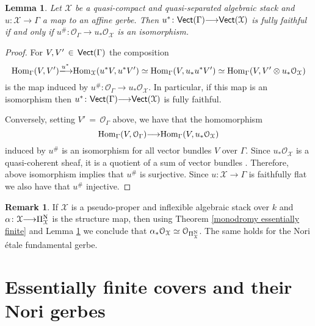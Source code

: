 \documentclass[12pt,reqno]{amsart}
\theoremstyle{plain}
\newtheorem{lem}[thm]{Lemma}
\theoremstyle{definition}
\newtheorem{rmk}[thm]{Remark}
\numberwithin{thm}{section}
\newcounter{x}\setcounter{x}{1}
\theoremstyle{plain}
\begin{document}
\begin{lem}\label{fully faithful on Vect means pushforwars O is O}
 Let ${\mathcal{X}}$ be a quasi-compact and quasi-separated algebraic stack and
$u\colon {\mathcal{X}}{\longrightarrow} \Gamma$ a map to an affine gerbe. Then $u^*\colon {\text{\sf Vect}}(\Gamma) {\longrightarrow} {\text{\sf Vect}}({\mathcal{X}})$ is fully faithful if and only if $u^\#\colon {\mathcal{O}_{\Gamma}}{\longrightarrow} u_*{\mathcal{O}_{\mathcal{X}}}$ is an isomorphism.
\end{lem}

\begin{proof}
For $V,V'\,\in\, {\text{\sf Vect}}(\Gamma)$ the composition 
 \[
 {{\rm Hom}}_\Gamma(V,V'){\xlongrightarrow{{u^*}}} {{\rm Hom}}_{\mathcal{X}}(u^*V,u^*V') \simeq {{\rm Hom}}_\Gamma(V,u_*u^*V') \simeq {{\rm Hom}}_\Gamma(V,V'\otimes u_*{\mathcal{O}_{\mathcal{X}}})
 \]
 is the map induced by $u^\#\colon {\mathcal{O}_{\Gamma}}{\longrightarrow} u_*{\mathcal{O}_{\mathcal{X}}}$. In particular, if
this map is an isomorphism then $u^*\colon {\text{\sf Vect}}(\Gamma){\longrightarrow} {\text{\sf Vect}}({\mathcal{X}})$ is fully
faithful.

Conversely, setting $V'\,=\,{\mathcal{O}_{\Gamma}}$ above, we have that the homomorphism $${{\rm Hom}}_\Gamma
(V,{\mathcal{O}_{\Gamma}}){\longrightarrow} {{\rm Hom}}_\Gamma (V,u_*{\mathcal{O}_{\mathcal{X}}})$$ induced by $u^\#$ is an isomorphism
for all vector bundles $V$ over $\Gamma$. Since $u_*{\mathcal{O}_{\mathcal{X}}}$ is a quasi-coherent
sheaf, it is a quotient of a sum of vector bundles \cite[p.~132, Corollary 3.9]{De}.
Therefore, above isomorphism implies that $u^\#$ is surjective. Since $u\colon
{\mathcal{X}}{\longrightarrow} \Gamma$ is faithfully flat we also have that $u^\#$ injective.
\end{proof}

\begin{rmk}\label{push of O Nori gerbe}
 If ${\mathcal{X}}$ is a pseudo-proper and inflexible algebraic stack over $k$ and
$\alpha\colon {\mathcal{X}}{\longrightarrow} \Pi^{\textup{N}}_{\mathcal{X}}$ 
is the structure map, then using Theorem \ref{monodromy essentially finite} and
Lemma \ref{fully faithful on Vect means pushforwars O is O} we conclude that
$\alpha_*{\mathcal{O}_{\mathcal{X}}}\simeq {\mathcal{O}_{{\Pi^{\textup{N}}_{\mathcal{X}}}}}$. The same holds for the Nori
\'etale fundamental gerbe.  
\end{rmk}

\section{Essentially finite covers and their Nori gerbes}
\end{document}
